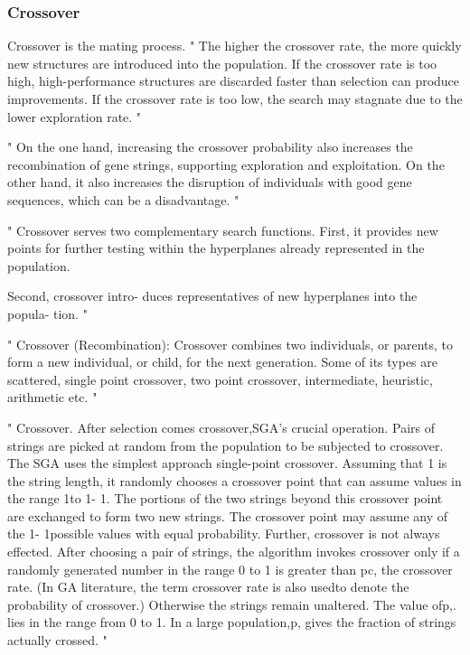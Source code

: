 \subsubsection{Crossover}
Crossover is the mating process.
"
The higher the crossover rate, the more quickly new structures are introduced into the population. If the crossover rate is too high, high-performance structures are discarded faster than selection can produce improvements. If the crossover rate is too low, the search may stagnate due to the lower exploration rate.
"\cite{grefenstette_optimization_1986}


"
On the one hand, increasing the crossover probability also increases the recombination of gene strings, supporting exploration and exploitation. On the other hand, it also increases the disruption of individuals with good gene sequences, which can be a disadvantage.
"\cite{klampfl_using_nodate}

"
Crossover serves two complementary search functions.
First, it provides new points for further testing within the hyperplanes already represented in the population.

Second, crossover intro- duces representatives of new hyperplanes into the popula- tion.
"\cite{grefenstette_optimization_1986}

"
Crossover (Recombination): Crossover combines two individuals, or parents, to form a new individual, or child, for the next generation. Some of its types are scattered, single point crossover, two point crossover, intermediate, heuristic, arithmetic etc.
"\cite{majumdar_genetic_2015}


"
Crossover. After selection comes crossover,SGA's crucial operation. Pairs of strings are picked at random from the population to be subjected to crossover. The SGA uses the simplest approach single-point crossover. Assuming that 1 is the string length, it randomly chooses a crossover point that can assume values in the range 1to 1- 1. The portions of the two strings beyond this crossover point are exchanged to form two new strings. The crossover point may assume any of the 1- 1possible values with equal probability. Further, crossover is not always effected. After choosing a pair of strings, the algorithm invokes crossover only if a randomly generated number in the range 0 to 1 is greater than pc, the crossover rate. (In GA literature, the term crossover rate is also usedto denote the probability of crossover.) Otherwise the strings remain unaltered. The value ofp,. lies in the range from 0 to 1. In a large population,p, gives the fraction of strings actually crossed.
"\cite{srinivas_genetic_1994}

